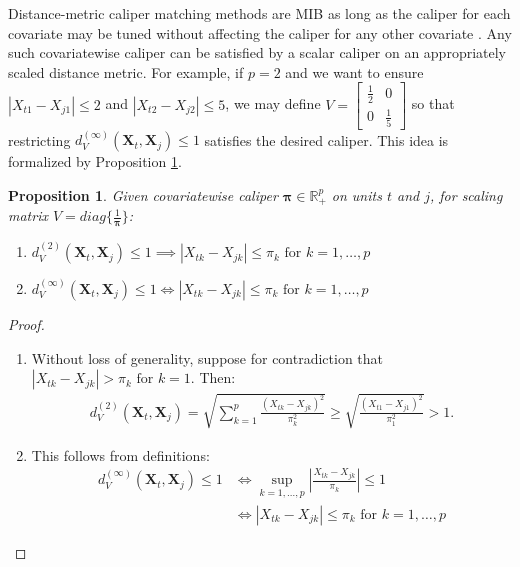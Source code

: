 \documentclass{article}
\newtheorem{proposition}[theorem]{Proposition}
\newcommand{\Xt}{\mathbf{X}_t}
\newcommand{\Xj}{\mathbf{X}_j}
\newcommand{\Rp}{\mathbb{R}^p}
\begin{document}
Distance-metric caliper matching methods are MIB as long as the caliper for each covariate may be tuned without affecting the caliper for any other covariate \citep{iacus2011multivariate}.
Any such covariatewise caliper can be satisfied by a scalar caliper on an appropriately scaled distance metric.
For example, if $p=2$ and we want to ensure $|X_{t1} - X_{j1}| \leq 2$ and $|X_{t2} - X_{j2}| \leq 5$, we may define $V = \begin{bmatrix} \frac{1}{2} & 0 \\ 0 & \frac{1}{5} \end{bmatrix}$ so that restricting $d^{(\infty)}_V(\Xt, \Xj) \leq 1$ satisfies the desired caliper.
This idea is formalized by Proposition \ref{prop:distmetriccal}.
\begin{proposition}
\label{prop:distmetriccal}
    Given covariatewise caliper $\boldsymbol{\pi} \in \Rp_{+}$ on units $t$ and $j$, for scaling matrix $V = diag\{\frac{1}{\boldsymbol{\pi}}\}$:
    \begin{enumerate}[label=(\alph*)]
        \item $d^{(2)}_V(\Xt, \Xj) \leq 1 \implies |X_{tk}-X_{jk}| \leq \pi_k \text{ for } k=1,\dots,p $
        \label{prop:dmca}
        \item $ d^{(\infty)}_V(\Xt, \Xj) \leq 1 \iff |X_{tk}-X_{jk}| \leq \pi_k \text{ for } k=1,\dots,p $
        \label{prop:dmcb}
    \end{enumerate}
\end{proposition}
\begin{proof}
    \begin{enumerate}[label=(\alph*)]
        \item Without loss of generality, suppose for contradiction that $|X_{tk}-X_{jk}| > \pi_k \text{ for } k=1$. 
        Then:
        \begin{align*}
            d^{(2)}_V(\Xt,\Xj) 
            = \sqrt{\sum_{k=1}^p \frac{(X_{tk}-X_{jk})^2}{\pi_k^2}}
            \geq \sqrt{\frac{(X_{t1}-X_{j1})^2}{\pi_1^2}}
            > 1.
        \end{align*}
        \item This follows from definitions:
        \begin{align*}
            d^{(\infty)}_V(\Xt, \Xj) \leq 1
            &\iff \sup_{k = 1, \dots, p} |\frac{X_{tk} - X_{jk}}{\pi_k}| \leq 1 \\
            &\iff |X_{tk}-X_{jk}| \leq \pi_k \text{ for } k=1,\dots,p 
        \end{align*}
    \end{enumerate}
\end{proof}
\end{document}
